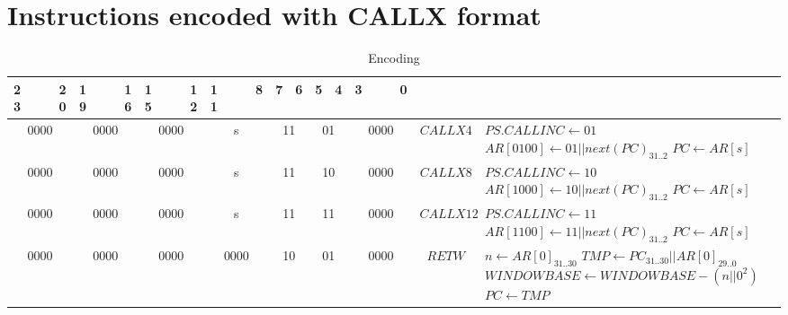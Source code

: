 \newpage

\section*{Instructions encoded with CALLX format}
\begin{longtable}{llllllllllllllllllllllll  p{1cm}  p{6cm} | }
	\caption{Encoding\label{long}}\\
	23 & & & 20 & 19 & & & 16 & 15 & & & 12 & 11 & & & 8 & 7 & 6 & 5 & 4 & 3 & & & 0 & & \multicolumn{1}{c}{}\\
	\hline
	\multicolumn{4}{|c|}{0000} & \multicolumn{4}{c|}{0000} & \multicolumn{4}{c|}{0000} & \multicolumn{4}{c|}{s} & \multicolumn{2}{c|}{11} & \multicolumn{2}{c|}{01} & \multicolumn{4}{c|}{0000} & \multicolumn{1}{c|}{$CALLX4$} & $PS.CALLINC \leftarrow {01}$ \newline $AR[0100] \leftarrow 01||next(PC)_{31..2}$ \newline $PC \leftarrow AR[s]$\\ \hline
	\multicolumn{4}{|c|}{0000} & \multicolumn{4}{c|}{0000} & \multicolumn{4}{c|}{0000} & \multicolumn{4}{c|}{s} & \multicolumn{2}{c|}{11} & \multicolumn{2}{c|}{10} & \multicolumn{4}{c|}{0000} & \multicolumn{1}{c|}{$CALLX8$} & $PS.CALLINC \leftarrow {10}$ \newline $AR[1000] \leftarrow 10||next(PC)_{31..2}$ \newline $PC \leftarrow AR[s]$\\ \hline
	\multicolumn{4}{|c|}{0000} & \multicolumn{4}{c|}{0000} & \multicolumn{4}{c|}{0000} & \multicolumn{4}{c|}{s} & \multicolumn{2}{c|}{11} & \multicolumn{2}{c|}{11} & \multicolumn{4}{c|}{0000} & \multicolumn{1}{c|}{$CALLX12$} & $PS.CALLINC \leftarrow {11}$ \newline $AR[1100] \leftarrow 11||next(PC)_{31..2}$ \newline $PC \leftarrow AR[s]$\\ \hline
	\multicolumn{4}{|c|}{0000} & \multicolumn{4}{c|}{0000} & \multicolumn{4}{c|}{0000} & \multicolumn{4}{c|}{0000} & \multicolumn{2}{c|}{10} & \multicolumn{2}{c|}{01} & \multicolumn{4}{c|}{0000} & \multicolumn{1}{c|}{$RETW$} & $n \leftarrow AR[0]_{31..30}$ \newline $TMP \leftarrow PC_{31..30}||AR[0]_{29..0}$ \newline $WINDOWBASE \leftarrow WINDOWBASE - (n||0^2)$ \newline $PC \leftarrow TMP$\\ \hline
\end{longtable}

